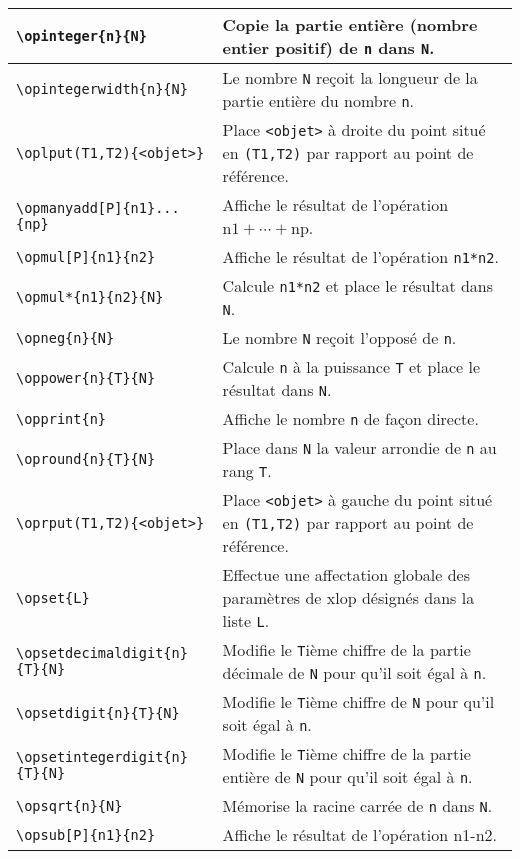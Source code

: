 \documentclass[12pt]{report}
\newcommand\package[1]{\textsf{#1}}
\begin{document}
\begin{longtable}{|l|p{6.3cm}|}
  \verb+\opinteger{n}{N}+ &
  Copie la partie entière (nombre entier positif) de \verb+n+
  dans \verb+N+. \\\hline
  \verb+\opintegerwidth{n}{N}+ &
  Le nombre \verb+N+ reçoit la longueur de la partie entière du
  nombre \verb+n+. \\\hline
  \verb+\oplput(T1,T2){<objet>}+ &
  Place \verb+<objet>+ à droite du point situé en
  \verb+(T1,T2)+ par rapport au point de référence. \\\hline
  \verb+\opmanyadd[P]{n1}...{np}+ &
  Affiche le résultat de l'opération
  $\mathrm{n1}+\cdots+\mathrm{np}$. \\\hline
  \verb+\opmul[P]{n1}{n2}+ &
  Affiche le résultat de l'opération \verb+n1*n2+. \\\hline
  \verb+\opmul*{n1}{n2}{N}+ &
  Calcule \verb+n1*n2+ et place le résultat dans
  \verb+N+. \\\hline
  \verb+\opneg{n}{N}+ &
  Le nombre \verb+N+ reçoit l'opposé de \verb+n+. \\\hline
  \verb+\oppower{n}{T}{N}+ &
  Calcule \verb+n+ à la puissance \verb+T+ et place le
  résultat dans \verb+N+. \\\hline
  \verb+\opprint{n}+ &
  Affiche le nombre \verb+n+ de façon directe. \\\hline
  \verb+\opround{n}{T}{N}+ &
  Place dans \verb+N+ la valeur arrondie de \verb+n+ au rang
  \verb+T+. \\\hline
  \verb+\oprput(T1,T2){<objet>}+ &
  Place \verb+<objet>+ à gauche du point situé en
  \verb+(T1,T2)+ par rapport au point de référence. \\\hline
  \verb+\opset{L}+ &
  Effectue une affectation globale des paramètres de \package{xlop}
  désignés dans la liste \verb+L+. \\\hline
  \verb+\opsetdecimaldigit{n}{T}{N}+ &
  Modifie le \verb+T+ième chiffre de la partie décimale de
  \verb+N+ pour qu'il soit égal à \verb+n+. \\\hline
  \verb+\opsetdigit{n}{T}{N}+ &
  Modifie le \verb+T+ième chiffre de \verb+N+ pour qu'il
  soit égal à \verb+n+. \\\hline
  \verb+\opsetintegerdigit{n}{T}{N}+ &
  Modifie le \verb+T+ième chiffre de la partie entière de
  \verb+N+ pour qu'il soit égal à \verb+n+. \\\hline
  \verb+\opsqrt{n}{N}+ &
  Mémorise la racine carrée de \verb+n+ dans \verb+N+. \\\hline
  \verb+\opsub[P]{n1}{n2}+ &
  Affiche le résultat de l'opération n1-n2. \\\hline

\end{longtable}
\end{document}
